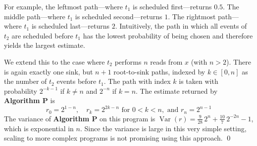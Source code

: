 \documentclass[acmsmall]{acmart}
\begin{document}
\begin{tcolorbox}[
    colback=SkyBlue!5,
    colframe=blue!20,
    boxrule=1pt,
    arc=2pt,
    width=\textwidth,
    boxsep=5pt,
    left=5pt,
    right=5pt,
    top=5pt,
    bottom=5pt
]
\begin{minipage}[b]{0.40\textwidth}
\end{minipage}%

For example, the leftmost path—where $t_1$ is scheduled first—returns $0.5$. The middle path—where $t_1$ is scheduled second—returns $1$. The rightmost path—where $t_1$ is scheduled last—returns $2$. Intuitively, the path in which all events of $t_2$ are scheduled before $t_1$ has the lowest probability of being chosen and therefore yields the largest estimate. 

We extend this to the case where $t_2$ performs $n$ reads from $x$ (with $n>2$). There is again exactly one sink, but $n{+}1$ root-to-sink paths, indexed by $k\in[0,n]$ as the number of $t_2$ events before $t_1$. The path with index $k$ is taken with probability $2^{-k-1}$ if $k\neq n$ and $2^{-n}$ if $k=n$. The estimate returned by \textbf{Algorithm P} is 
\[
r_0 = 2^{1-n}, \quad r_k = 2^{2k-n} \mbox{ for }0< k <n, \mbox{ and }r_n = 2^{n-1}
\]
%
The variance of \textbf{Algorithm P} on this program is $\operatorname{Var}(r)=\frac{9}{28}\,2^{n}+\frac{10}{7}\,2^{-2n}-1$, which is exponential in $n$. Since the variance is large in this very simple setting, scaling to more complex programs is not promising using this approach.
\qed
\end{tcolorbox}

% 
\end{document}
